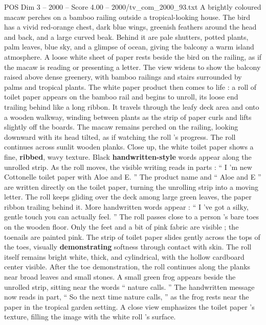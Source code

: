 \begin{textsample}{POS Dim 3 – 2000 – Score 4.00 – 2000/tv\_com\_2000\_93.txt}  \label{ex:f3_pos_069}
A brightly coloured macaw perches on a bamboo railing outside a tropical-looking house.
The bird has a vivid red-orange chest, dark blue wings, greenish feathers around the head and back, and a large curved beak.
Behind it are pale shutters, potted plants, palm leaves, blue sky, and a glimpse of ocean, giving the balcony a warm island atmosphere.
A loose white sheet of paper rests beside the bird on the railing, as if the macaw is reading or presenting a letter.
The view widens to show the balcony raised above dense greenery, with bamboo railings and stairs surrounded by palms and tropical plants.
The white paper product then comes to life : a roll of toilet paper appears on the bamboo rail and begins to unroll, its loose end trailing behind like a long ribbon.
It travels through the leafy deck area and onto a wooden walkway, winding between plants as the strip of paper curls and lifts slightly off the boards.
The macaw remains perched on the railing, looking downward with its head tilted, as if watching the roll ’s progress.
The roll continues across sunlit wooden planks.
Close up, the white toilet paper shows a fine, \textbf{ribbed}, wavy texture.
Black \textbf{handwritten-style} words appear along the unrolled strip.
As the roll moves, the visible writing reads in parts : “ I ’m new Cottonelle toilet paper with Aloe and E. ” The product name and “ Aloe and E ” are written directly on the toilet paper, turning the unrolling strip into a moving letter.
The roll keeps gliding over the deck among large green leaves, the paper ribbon trailing behind it.
More handwritten words appear : “ I ’ve got a silky, gentle touch you can actually feel. ” The roll passes close to a person ’s bare toes on the wooden floor.
Only the feet and a bit of pink fabric are visible ; the toenails are painted pink.
The strip of toilet paper slides gently across the tops of the toes, visually \textbf{demonstrating} softness through contact with skin.
The roll itself remains bright white, thick, and cylindrical, with the hollow cardboard center visible.
After the toe demonstration, the roll continues along the planks near broad leaves and small stones.
A small green frog appears beside the unrolled strip, sitting near the words “ nature calls. ” The handwritten message now reads in part, “ So the next time nature calls, ” as the frog rests near the paper in the tropical garden setting.
A close view emphasizes the toilet paper ’s texture, filling the image with the white roll ’s surface.

\end{textsample}
